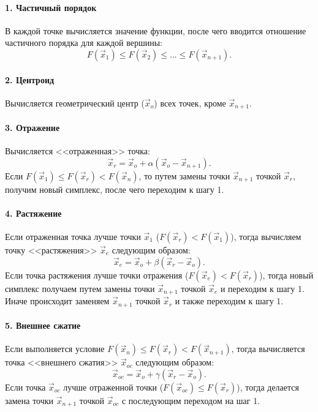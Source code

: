 \paragraph{1. Частичный порядок}
\noindent\indent В каждой точке вычисляется значение функции, после чего вводится
отношение частичного порядка для каждой вершины:
\begin{equation}
  F(\vec{x}_1) \leq F(\vec{x}_2) \leq ... \leq F(\vec{x}_{n+1}).
\end{equation}
\paragraph{2. Центроид}
\noindent\indent Вычисляется геометрический центр ($\vec{x}_{o}$) всех точек,
кроме $\vec{x}_{n+1}$.
\paragraph{3. Отражение}
\noindent\indent Вычисляется <<отраженная>> точка:
\begin{equation}
  \vec{x}_r = \vec{x}_o + \alpha(\vec{x}_o - \vec{x}_{n+1}).
\end{equation}
Если $F(\vec{x}_1) \leq F(\vec{x}_r) < F(\vec{x}_n)$, то
путем замены точки $\vec{x}_{n+1}$ точкой $\vec{x}_r$, получим новый симплекс,
после чего переходим к шагу 1.
\paragraph{4. Растяжение}
\noindent\indent Если отраженная точка лучше точки $\vec{x}_1$
($F(\vec{x}_r) < F(\vec{x}_1) $), тогда вычисляем точку <<растяжения>>
$\vec{x}_e$ следующим образом:
\begin{equation}
  \vec{x}_e = \vec{x}_o + \beta(\vec{x}_r - \vec{x}_o).
\end{equation}
Если точка растяжения лучше точки отражения ($F(\vec{x}_e) < F(\vec{x}_r)$),
тогда новый симплекс получаем путем замены точки $\vec{x}_{n+1}$ точкой
$\vec{x}_e$ и переходим к шагу 1.
Иначе происходит заменяем $\vec{x}_{n+1}$ точкой $\vec{x}_r$ и также переходим
к шагу 1.
\paragraph{5. Внешнее сжатие}
\noindent\indent Если выполняется условие $F(\vec{x}_n) \leq F(\vec{x}_r) < F(\vec{x}_{n+1})$,
тогда вычисляется точка <<внешнего сжатия>> $\vec{x}_{oc}$ следующим образом:
\begin{equation}
  \vec{x}_{oc} = \vec{x}_o + \gamma(\vec{x}_{r} - \vec{x}_o).
\end{equation}
Если точка $\vec{x}_{oc}$ лучше отраженной точки ($F(\vec{x}_{oc}) \leq F(\vec{x}_{r})$),
тогда делается замена точки $\vec{x}_{n+1}$ точкой $\vec{x}_{oc}$ с последующим
переходом на шаг 1.
